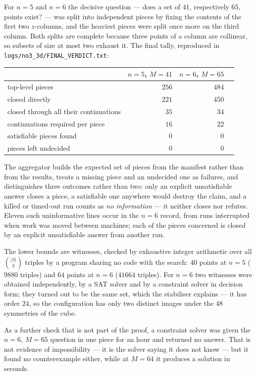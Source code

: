 \documentclass[11pt,a4paper]{article}
\begin{document}
For $n=5$ and $n=6$ the decisive question --- does a set of $41$, respectively $65$, points exist? --- was
split into independent pieces by fixing the contents of the first two $z$-columns, and the heaviest pieces
were split once more on the third column.  Both splits are complete because three points of a column are
collinear, so subsets of size at most two exhaust it.  The final tally, reproduced in
\texttt{logs/no3\_3d/FINAL\_VERDICT.txt}:
\begin{center}\begin{tabular}{lrrr}\toprule
 & $n=5$, $M=41$ & $n=6$, $M=65$\\\midrule
top-level pieces & $256$ & $484$\\
closed directly & $221$ & $450$\\
closed through all their continuations & $35$ & $34$\\
continuations required per piece & $16$ & $22$\\
satisfiable pieces found & $0$ & $0$\\
pieces left undecided & $0$ & $0$\\\bottomrule
\end{tabular}\end{center}
The aggregator builds the expected set of pieces from the manifest rather than from the results, treats a
missing piece and an undecided one as failures, and distinguishes three outcomes rather than two: only an
explicit unsatisfiable answer closes a piece, a satisfiable one anywhere would destroy the claim, and a
killed or timed-out run counts as \emph{no information} --- it neither closes nor refutes.  Eleven such
uninformative lines occur in the $n=6$ record, from runs interrupted when work was moved between machines;
each of the pieces concerned is closed by an explicit unsatisfiable answer from another run.

The lower bounds are witnesses, checked by exhaustive integer arithmetic over all $\binom{|S|}{3}$ triples by
a program sharing no code with the search: $40$ points at $n=5$ ($9880$ triples) and $64$ points at $n=6$
($41664$ triples).  For $n=6$ two witnesses were obtained independently, by a SAT solver and by a constraint
solver in decision form; they turned out to be the same set, which the stabiliser explains --- it has order
$24$, so the configuration has only two distinct images under the $48$ symmetries of the cube.

As a further check that is not part of the proof, a constraint solver was given the $n=6$, $M=65$ question in
one piece for an hour and returned no answer.  That is not evidence of impossibility --- it is the solver
saying it does not know --- but it found no counterexample either, while at $M=64$ it produces a solution in
seconds.
\end{document}
